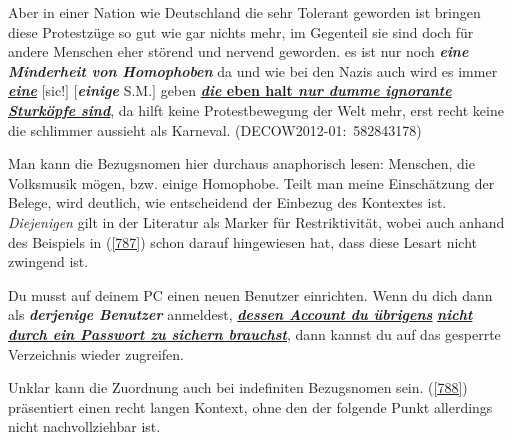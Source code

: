 \begin{exe}
	\ex\label{786} 
	\scriptsize
	Aber in einer Nation wie Deutschland die sehr Tolerant geworden ist bringen diese \glqq Protestzüge\grqq{} so gut wie gar 		nichts mehr, im Gegenteil sie sind doch für andere Menschen eher störend und nervend geworden. es ist nur noch 					\textbf{\textit{eine Minderheit von Homophoben}} da und wie bei den Nazis auch wird es immer 									\underline{\textit{\textbf{eine}}} $[$sic!$]$ $[$\textbf{\textit{einige}} S.M.$]$ geben \underline{\textbf{\textit{die} 		eben halt \textit{nur dumme ignorante Sturköpfe sind}}}, da hilft keine Protestbewegung der Welt mehr, erst recht keine die 	schlimmer aussieht als Karneval.                                                                                                                                                               
	\newline
	\hbox{}\hfill\hbox{(DECOW2012-01: 582843178)}
\end{exe}
Man kann die Bezugsnomen hier durchaus anaphorisch lesen: Menschen, die Volksmusik mögen, bzw. einige Homophobe. Teilt man meine Einschätzung der Belege, wird deutlich, wie entscheidend der Einbezug des Kontextes ist. \textit{Diejenigen} gilt in der Literatur als Marker für Restriktivität, wobei auch \citet[302]{Bluehdorn2007} anhand des Beispiels in (\ref{787}) schon darauf hingewiesen hat, dass diese Lesart nicht zwingend ist.
	
\begin{exe}
	\ex\label{787} 
	\scriptsize
	Du musst auf deinem PC einen neuen Benutzer einrichten. Wenn du dich dann als \textbf{\textit{derjenige Benutzer}} 				anmeldest, \underline{\textbf{\textit{dessen Account du übrigens}}} \underline{\textbf{\textit{nicht durch ein Passwort zu 		sichern brauchst}}}, dann kannst du auf das gesperrte Verzeichnis wieder zugreifen.
\end{exe}								
Unklar kann die Zuordnung auch bei indefiniten Bezugsnomen sein. (\ref{788}) präsentiert einen recht langen Kontext, ohne den der folgende Punkt allerdings nicht nachvollziehbar ist.

